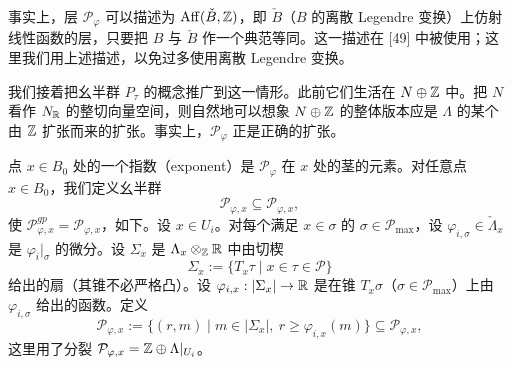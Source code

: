 \begin{remark}
事实上，层 $\mathcal{P}_\varphi$ 可以描述为 $\operatorname{Aff}(\check B,\mathbb{Z})$，即 $\check B$（$B$ 的离散 Legendre 变换）上仿射线性函数的层，只要把 $B$ 与 $\check B$ 作一个典范等同。这一描述在 [49] 中被使用；这里我们用上述描述，以免过多使用离散 Legendre 变换。
\end{remark}

我们接着把幺半群 $P_\tau$ 的概念推广到这一情形。此前它们生活在 $N\oplus\mathbb{Z}$ 中。把 $N$ 看作 $N_{\mathbb{R}}$ 的整切向量空间，则自然地可以想象 $N\oplus\mathbb{Z}$ 的整体版本应是 $\Lambda$ 的某个由 $\mathbb{Z}$ 扩张而来的扩张。事实上，$\mathcal{P}_\varphi$ 正是正确的扩张。

\begin{definition}
点 $x\in B_0$ 处的一个指数（exponent）是 $\mathcal{P}_\varphi$ 在 $x$ 处的茎的元素。对任意点 $x\in B_0$，我们定义幺半群
\[
\mathcal{P}_{\varphi,x}\subseteq\mathcal{P}_{\varphi,x},
\]
使 $\mathcal{P}^{gp}_{\varphi,x}=\mathcal{P}_{\varphi,x}$，如下。设 $x\in U_i$。对每个满足 $x\in\sigma$ 的 $\sigma\in\mathcal{P}_{\max}$，设 $\varphi_{i,\sigma}\in\check\Lambda_x$ 是 $\varphi_i|_\sigma$ 的微分。设 $\Sigma_x$ 是 $\Lambda_x\otimes_{\mathbb{Z}}\mathbb{R}$ 中由切楔
\[
\Sigma_x:=\{T_x\tau\mid x\in\tau\in\mathcal{P}\}
\]
给出的扇（其锥不必严格凸）。设 $\varphi_{i,x}:|\Sigma_x|\to\mathbb{R}$ 是在锥 $T_x\sigma$（$\sigma\in\mathcal{P}_{\max}$）上由 $\varphi_{i,\sigma}$ 给出的函数。定义
\[
\mathcal{P}_{\varphi,x}:=\{(r,m)\mid m\in|\Sigma_x|,\ r\ge\varphi_{i,x}(m)\}\subseteq\mathcal{P}_{\varphi,x},
\]
这里用了分裂 $\mathcal{P}_{\varphi,x}=\mathbb{Z}\oplus\Lambda|_{U_i}$。
\end{definition}

